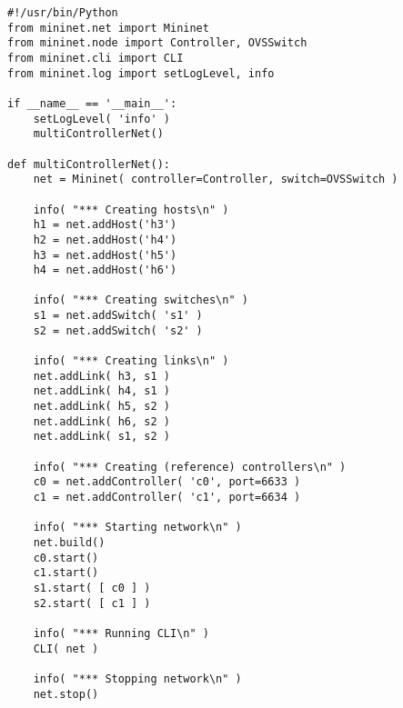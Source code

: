 \begin{minipage}{\linewidth}
\begin{lstlisting}[label=lst:activity-1-script, caption=complete Python script required for Activity 1]
#!/usr/bin/Python
from mininet.net import Mininet
from mininet.node import Controller, OVSSwitch
from mininet.cli import CLI
from mininet.log import setLogLevel, info

if __name__ == '__main__':
    setLogLevel( 'info' )
    multiControllerNet()

def multiControllerNet():
    net = Mininet( controller=Controller, switch=OVSSwitch )

    info( "*** Creating hosts\n" )
    h1 = net.addHost('h3')
    h2 = net.addHost('h4')
    h3 = net.addHost('h5')
    h4 = net.addHost('h6')

    info( "*** Creating switches\n" )
    s1 = net.addSwitch( 's1' )
    s2 = net.addSwitch( 's2' )

    info( "*** Creating links\n" )
    net.addLink( h3, s1 )
    net.addLink( h4, s1 )
    net.addLink( h5, s2 )
    net.addLink( h6, s2 )
    net.addLink( s1, s2 )

    info( "*** Creating (reference) controllers\n" )
    c0 = net.addController( 'c0', port=6633 )
    c1 = net.addController( 'c1', port=6634 )

    info( "*** Starting network\n" )
    net.build()
    c0.start()
    c1.start()
    s1.start( [ c0 ] )
    s2.start( [ c1 ] )

    info( "*** Running CLI\n" )
    CLI( net )

    info( "*** Stopping network\n" )
    net.stop()
\end{lstlisting}
\end{minipage}
